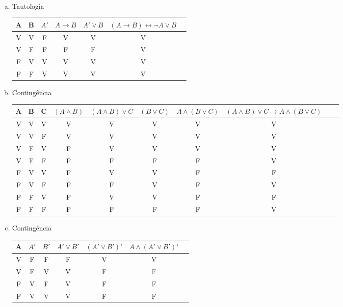 \begin{Gabarito}{9}
~

    \begin{enumerate}[a)]
      \item Tautologia \\
      \begin{tabular}{|c|c|c|c|c|c|c|}
        \hline
        A & B & $ A' $ & $A \rightarrow B$ & $A' \lor B$ & $(A \rightarrow B) \leftrightarrow \lnot A \lor B$ \\
        \hline
        V & V & F & V & V & V \\
        V & F & F & F & F & V \\
        F & V & V & V & V & V \\
        F & F & V & V & V & V \\
        \hline
      \end{tabular}

      \item Contingência \\
      \begin{tabular}{|c|c|c|c|c|c|c|c|c|c|}
        \hline
        A & B & C & $(A \land B)$ & $(A \land B) \lor C$ & $(B \lor C)$ & $A \land (B \lor C)$ & $(A \land B) \lor C \rightarrow A \land (B \lor C)$ \\
        \hline
        V & V & V & V & V & V & V & V \\
        V & V & F & V & V & V & V & V \\
        V & F & V & F & V & V & V & V \\
        V & F & F & F & F & F & F & V \\
        F & V & V & F & V & V & F & F \\
        F & V & F & F & F & V & F & V \\
        F & F & V & F & V & V & F & F \\
        F & F & F & F & F & F & F & V \\
        \hline
      \end{tabular}

      \item Contingência \\
      \begin{tabular}{|c|c|c|c|c|c|c|}
        \hline
        A & $A'$ & $B'$ & $A' \lor B'$ & $(A' \lor B')'$ & $A \land (A' \lor B')'$ \\
        \hline
        V & F & F & F & V & V \\
        V & F & V & V & F & F \\
        F & V & F & V & F & F \\
        F & V & V & V & F & F \\
        \hline
      \end{tabular}


\end{enumerate}
\end{Gabarito}
